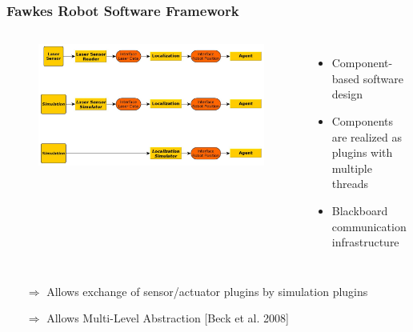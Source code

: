 \documentclass[]{beamer}
\begin{document}
\begin{frame}
  \frametitle{Fawkes Robot Software Framework}
  \begin{columns}
    \begin{figure}
      \includegraphics[width=\textwidth]{../tabs/mla_complete.jpg}
    \end{figure}
    \begin{itemize}
    \item Component-based software design
    \item Components are realized as plugins with multiple threads
    \item Blackboard communication infrastructure
      \pause
    \end{itemize}
  \end{columns}
  \begin{itemize}
  \item[$\Rightarrow$] Allows exchange of sensor/actuator plugins by simulation plugins
  \item[$\Rightarrow$] Allows Multi-Level Abstraction [Beck et al. 2008]
  \end{itemize}
\end{frame}
\end{document}
